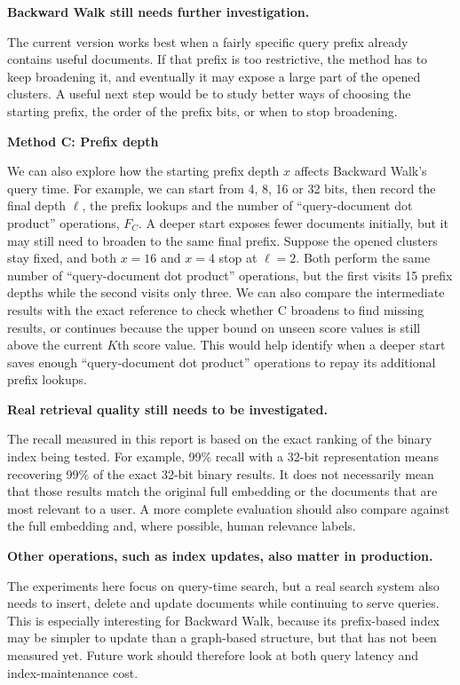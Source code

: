 \textbf{Backward Walk still needs further investigation.}\par
The current version works best when a fairly specific query prefix already contains useful documents. If that prefix is too restrictive, the method has to keep broadening it, and eventually it may expose a large part of the opened clusters. A useful next step would be to study better ways of choosing the starting prefix, the order of the prefix bits, or when to stop broadening.

\textbf{Method C: Prefix depth}\par
We can also explore how the starting prefix depth $x$ affects Backward Walk's query time. For example, we can start from 4, 8, 16 or 32 bits, then record the final depth $\ell$, the prefix lookups and the number of ``query-document dot product'' operations, $F_C$. A deeper start exposes fewer documents initially, but it may still need to broaden to the same final prefix. Suppose the opened clusters stay fixed, and both $x=16$ and $x=4$ stop at $\ell=2$. Both perform the same number of ``query-document dot product'' operations, but the first visits 15 prefix depths while the second visits only three. We can also compare the intermediate results with the exact reference to check whether C broadens to find missing results, or continues because the upper bound on unseen score values is still above the current $K$th score value. This would help identify when a deeper start saves enough ``query-document dot product'' operations to repay its additional prefix lookups.

\textbf{Real retrieval quality still needs to be investigated.}\par
The recall measured in this report is based on the exact ranking of the binary index being tested. For example, 99\% recall with a 32-bit representation means recovering 99\% of the exact 32-bit binary results. It does not necessarily mean that those results match the original full embedding or the documents that are most relevant to a user. A more complete evaluation should also compare against the full embedding and, where possible, human relevance labels.

\textbf{Other operations, such as index updates, also matter in production.}\par
The experiments here focus on query-time search, but a real search system also needs to insert, delete and update documents while continuing to serve queries. This is especially interesting for Backward Walk, because its prefix-based index may be simpler to update than a graph-based structure, but that has not been measured yet. Future work should therefore look at both query latency and index-maintenance cost.

